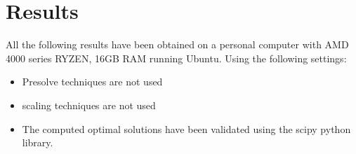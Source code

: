 \section{Results}
All the following results have been obtained on a personal computer with AMD 4000 series
RYZEN, 16GB RAM running Ubuntu. Using the following settings:
\begin{itemize}
    \item Presolve techniques are not used
    \item scaling techniques are not used
    \item The computed optimal solutions have been validated using the scipy python library.
\end{itemize}